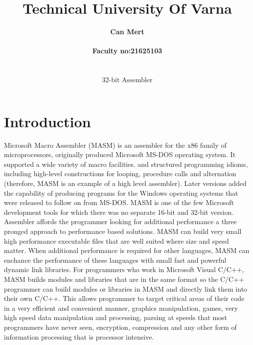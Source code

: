 \documentclass[12pt]{extarticle}
\begin{document}
\title{\Huge\textbf{ Technical University Of Varna}}
\author{\huge \textbf{ Can Mert} \\ \\ \Large \textbf{ Faculty no:21625103} \\ \\ \\  \LARGE 32-bit Assembler} 

\date{}



\maketitle

\newpage


\section{Introduction}

Microsoft Macro Assembler (MASM) is an assembler for the x86 family of microprocessors, originally
produced Microsoft MS-DOS operating system. It supported a wide variety of macro facilities. and structured programming idioms,
including high-level constructions for looping, procedure calls and alternation (therefore, MASM is an example of a high level assembler).
Later versions added the capability of producing programs for the Windows operating systems that were released to 
follow on from MS-DOS. MASM is one of the few Microsoft development tools for which there was no separate 16-bit and 32-bit version.
Assembler affords the programmer looking for additional performance a three pronged approach to performance based solutions.
MASM can build very small high performance executable files that are well suited where size and speed matter.
When additional performance is required for other languages, MASM can enchance the performance of these languages
with small fast and powerful dynamic link libraries. For programmers who work in Microsoft Visual C/C++, MASM builds modules
and libraries that are in the same format so the C/C++ programmer can build modules or libraries in MASM
and directly link them into their own C/C++. This allows programmer to target critical areas of their code
in a very efficient and convenient manner, graphics manipulation, games, very high speed data manipulation and processing,
parsing at speeds that most programmers have never seen, encryption, compression and any other form of information
processing that is processor intensive. \\ 
\end{document}
